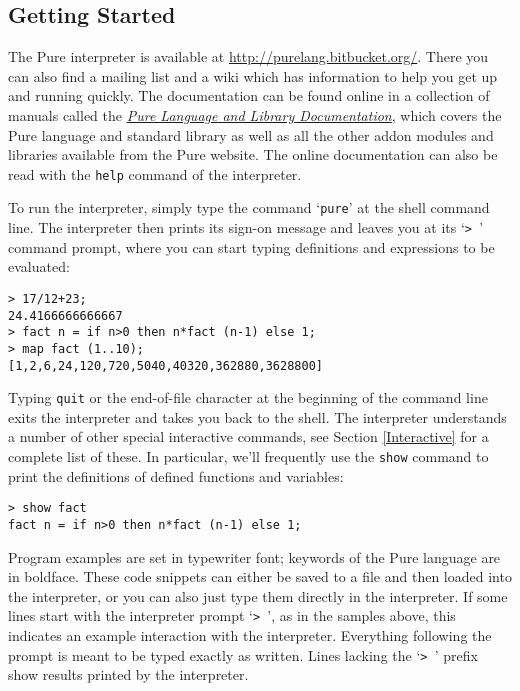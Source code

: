 \documentclass[a4paper,12pt]{article}
\begin{document}
\subsection{Getting Started}

The Pure interpreter is available at \url{http://purelang.bitbucket.org/}. There you can also find a mailing list and a wiki which has information to help you get up and running quickly. The documentation can be found online in a collection of manuals called the \emph{\href{http://puredocs.bitbucket.org/}{Pure Language and Library Documentation}}, which covers the Pure language and standard library as well as all the other addon modules and libraries available from the Pure website. The online documentation can also be read with the \verb|help| command of the interpreter.

To run the interpreter, simply type the command `\texttt{pure}' at the shell command line. The interpreter then prints its sign-on message and leaves you at its `\verb|> |' command prompt, where you can start typing definitions and expressions to be evaluated:

\begin{lstlisting}
> 17/12+23;
24.4166666666667
> fact n = if n>0 then n*fact (n-1) else 1;
> map fact (1..10);
[1,2,6,24,120,720,5040,40320,362880,3628800]
\end{lstlisting}

Typing \verb|quit| or the end-of-file character at the beginning of the command line exits the interpreter and takes you back to the shell. The interpreter understands a number of other special interactive commands, see Section \ref{Interactive} for a complete list of these. In particular, we'll frequently use the \verb|show| command to print the definitions of defined functions and variables:

\begin{lstlisting}
> show fact
fact n = if n>0 then n*fact (n-1) else 1;
\end{lstlisting}

Program examples are set in typewriter font; keywords of the Pure language are in boldface. These code snippets can either be saved to a file and then loaded into the interpreter, or you can also just type them directly in the interpreter. If some lines start with the interpreter prompt `\verb|> |', as in the samples above, this indicates an example interaction with the interpreter. Everything following the prompt is meant to be typed exactly as written. Lines lacking the `\verb|> |' prefix show results printed by the interpreter.
\end{document}

